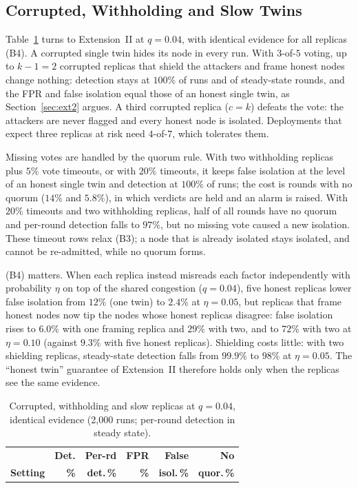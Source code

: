 \subsection{Corrupted, Withholding and Slow Twins}
\label{sec:res-ext2}
Table~\ref{tab:collusion} turns to Extension~II at $q=0.04$, with
identical evidence for all replicas (B4).  A
corrupted single twin hides its node in every run.  With $3$-of-$5$
voting, up to $k-1=2$ corrupted replicas that shield the attackers and
frame honest nodes change nothing: detection stays at $100\%$ of runs
and of steady-state rounds, and the FPR and false isolation equal those
of an honest single twin, as Section~\ref{sec:ext2} argues.  A third
corrupted replica ($c=k$) defeats the vote: the attackers are never
flagged and every honest node is isolated.  Deployments that expect
three replicas at risk need $4$-of-$7$, which tolerates them.

Missing votes are handled by the quorum rule.  With two withholding
replicas plus $5\%$ vote timeouts, or with $20\%$ timeouts, it keeps
false isolation at the level of an honest single twin and detection at
$100\%$ of runs; the cost is rounds with no quorum ($14\%$ and
$5.8\%$), in which verdicts are held and an alarm is raised.  With
$20\%$ timeouts and two withholding replicas, half of all rounds have
no quorum and per-round detection falls to $97\%$, but no missing
vote caused a new isolation.  These timeout rows relax (B3); a node
that is already isolated stays isolated, and cannot be re-admitted,
while no quorum forms.

(B4) matters.  When each replica instead misreads each factor
independently with probability $\eta$ on top of the shared congestion
($q=0.04$), five honest replicas lower false isolation from $12\%$
(one twin) to $2.4\%$ at $\eta=0.05$, but replicas that frame honest
nodes now tip the nodes whose honest replicas disagree: false
isolation rises to $6.0\%$ with one framing replica and $29\%$ with
two, and to $72\%$ with two at $\eta=0.10$ (against $9.3\%$ with
five honest replicas).  Shielding costs little: with two shielding
replicas, steady-state detection falls from $99.9\%$ to $98\%$ at
$\eta=0.05$.  The ``honest twin'' guarantee of Extension~II therefore
holds only when the replicas see the same evidence.

\begin{table}[!t]
\caption{Corrupted, withholding and slow replicas at $q=0.04$, identical evidence (2{,}000 runs; per-round detection in steady state).}
\label{tab:collusion}
\centering
\renewcommand{\arraystretch}{1.08}
\footnotesize
\setlength{\tabcolsep}{2.0pt}
\begin{tabular}{p{}rrrrr}
\toprule
 & \textbf{Det.} & \textbf{Per-rd} & \textbf{FPR} & \textbf{False} & \textbf{No} \\
\textbf{Setting} & \textbf{\%} & \textbf{det.\,\%} & \textbf{\%} & \textbf{isol.\,\%} & \textbf{quor.\,\%} \\
\midrule
\bottomrule
\end{tabular}
\end{table}

